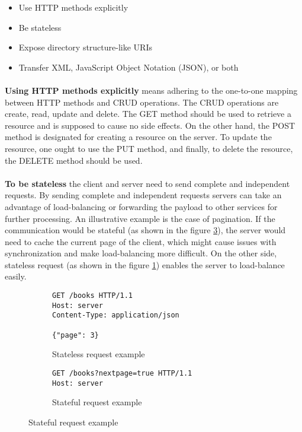 \begin{itemize}
  \item Use HTTP methods explicitly
  \item Be stateless
  \item Expose directory structure-like URIs
  \item Transfer XML, JavaScript Object Notation (JSON), or both
\end{itemize}

\paragraph{}
\textbf{Using HTTP methods explicitly} means adhering to the one-to-one mapping between HTTP methods and CRUD operations. The CRUD operations are create, read, update and delete. The GET method should be used to retrieve a resource and is supposed to cause no side effects. On the other hand, the POST method is designated for creating a resource on the server. To update the resource, one ought to use the PUT method, and finally, to delete the resource, the DELETE method should be used.

\paragraph{}
\textbf{To be stateless} the client and server need to send complete and independent requests. By sending complete and independent requests servers can take an advantage of load-balancing or forwarding the payload to other services for further processing. An illustrative example is the case of pagination. If the communication would be stateful (as shown in the figure \ref{fig:Stateful request example}), the server would need to cache the current page of the client, which might cause issues with synchronization and make load-balancing more difficult. On the other side, stateless request (as shown in the figure \ref{fig:Stateless request example}) enables the server to load-balance easily.

\begin{figure}[h]
  \begin{subfigure}{}
    \begin{minipage}{0.5\textwidth}
      \begin{verbatim}
GET /books HTTP/1.1
Host: server
Content-Type: application/json

{"page": 3}
      \end{verbatim}
      \caption{Stateless request example}
      \label{fig:Stateless request example}
    \end{minipage}
  \end{subfigure}
  \begin{subfigure}{}
    \begin{minipage}{0.5\textwidth}
      \begin{verbatim}
GET /books?nextpage=true HTTP/1.1
Host: server
      \end{verbatim}
      \caption{Stateful request example}
      \label{fig:Stateful request example}
    \end{minipage}
  \end{subfigure}
\end{figure}

